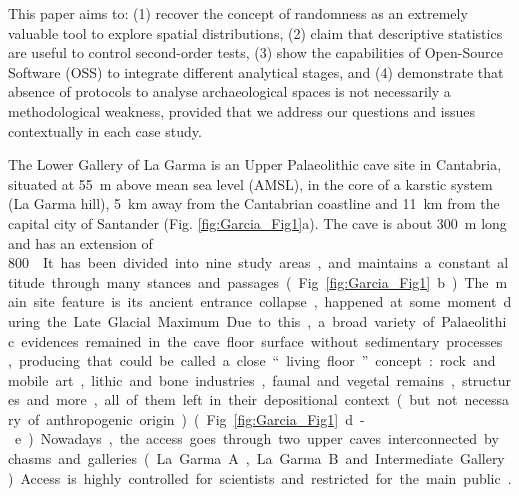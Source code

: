 	This paper aims to: (1) recover the concept of randomness as an extremely valuable tool to explore spatial distributions, (2) claim that descriptive statistics are useful to control second-order tests, (3) show the capabilities of Open-Source Software (OSS) to integrate different analytical stages, and (4) demonstrate that absence of protocols to analyse archaeological spaces is not necessarily a methodological weakness, provided that we address our questions and issues contextually in each case study.



The Lower Gallery of La Garma is an Upper Palaeolithic cave site in Cantabria, situated at \SI{55}{\metre} above mean sea level (AMSL), in the core of a karstic system (La Garma hill), \SI{5}{\kilo\metre} away from the Cantabrian coastline and \SI{11}{\kilo\metre} from the capital city of Santander (Fig. \ref{fig:Garcia_Fig1}a). The cave is about \SI{300}{\metre} long and has an extension of \SI{800}{\metre\square}. It has been divided into nine study areas, and maintains a constant altitude through many stances and passages (Fig. \ref{fig:Garcia_Fig1}b). The main site feature is its ancient entrance collapse, happened at some moment during the Late Glacial Maximum. Due to this, a broad variety of Palaeolithic evidences remained in the cave floor surface without sedimentary processes, producing that could be called a close “living floor” concept: rock and mobile art, lithic and bone industries, faunal and vegetal remains, structures and more, all of them left in their depositional context (but not necessary of anthropogenic origin) (Fig. \ref{fig:Garcia_Fig1}d-e). Nowadays, the access goes through two upper caves interconnected by chasms and galleries (La Garma A, La Garma B and Intermediate Gallery). Access is highly controlled for scientists and restricted for the main public \parencites{Arias_2011}{Maximiano_2013}{Ontañón_2003}.


